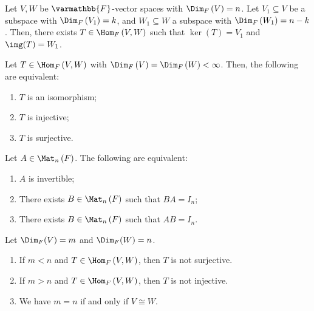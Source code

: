 \documentclass[10pt]{mypackage}
\renewcommand*{\mathbb}[1]{\varmathbb{#1}}
\begin{document}
\begin{corollary}
  Let $V,W$ be $\mathbb{F}$-vector spaces with $\Dim_{F}\left(V\right) = n$. Let $V_1\subseteq V$ be a subspace with $\Dim_{F}\left(V_1\right) = k$, and $W_1\subseteq W$ a subspace with $\Dim_{F}\left(W_1\right) = n-k$. Then, there exists $T\in \Hom_{F}\left(V,W\right)$ such that $\ker(T) = V_1$ and $\img(T) = W_1$.
\end{corollary}
\begin{corollary}
  Let $T\in \Hom_{F}\left(V,W\right)$ with $\Dim_{F}\left(V\right) = \Dim_{F}\left(W\right) < \infty$. Then, the following are equivalent:
  \begin{enumerate}[(1)]
    \item $T$ is an isomorphism;
    \item $T$ is injective;
    \item $T$ is surjective.
  \end{enumerate}
\end{corollary}
\begin{corollary}
  Let $A\in \Mat_{n}\left(F\right)$. The following are equivalent:
  \begin{enumerate}[(1)]
    \item $A$ is invertible;
    \item There exists $B\in \Mat_{n}\left(F\right)$ such that $BA = I_{n}$;
    \item There exists $B\in \Mat_{n}\left(F\right)$ such that $AB = I_n$.
  \end{enumerate}
\end{corollary}
\begin{corollary}
  Let $\Dim_{F}(V) = m$ and $\Dim_{F}(W) = n$.
  \begin{enumerate}[(1)]
    \item If $m < n$ and $T\in \Hom_{F}\left(V,W\right)$, then $T$ is not surjective.
    \item If $m > n$ and $T\in \Hom_F\left(V,W\right)$, then $T$ is not injective.
    \item We have $m = n$ if and only if $V\cong W$.
  \end{enumerate}
\end{corollary}
\end{document}
